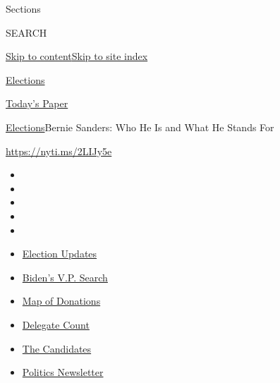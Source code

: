 Sections

SEARCH

\protect\hyperlink{site-content}{Skip to
content}\protect\hyperlink{site-index}{Skip to site index}

\href{https://www.nytimes.com/news-event/2020-election}{Elections}

\href{https://myaccount.nytimes.com/auth/login?response_type=cookie\&client_id=vi}{}

\href{https://www.nytimes.com/section/todayspaper}{Today's Paper}

\href{/news-event/2020-election}{Elections}\textbar{}Bernie Sanders: Who
He Is and What He Stands For

\url{https://nyti.ms/2LIJy5e}

\begin{itemize}
\item
\item
\item
\item
\item
\end{itemize}

\begin{itemize}
\item
  \href{https://www.nytimes.com/2020/07/31/us/elections/biden-vs-trump.html?action=click\&pgtype=Article\&state=default\&region=TOP_BANNER\&context=storylines_menu}{Election
  Updates}
\item
  \href{https://www.nytimes.com/article/biden-vice-president-2020.html?action=click\&pgtype=Article\&state=default\&region=TOP_BANNER\&context=storylines_menu}{Biden's
  V.P. Search}
\item
  \href{https://www.nytimes.com/interactive/2020/07/24/us/politics/trump-biden-campaign-donors.html?action=click\&pgtype=Article\&state=default\&region=TOP_BANNER\&context=storylines_menu}{Map
  of Donations}
\item
  \href{https://www.nytimes.com/interactive/2020/us/elections/delegate-count-primary-results.html?action=click\&pgtype=Article\&state=default\&region=TOP_BANNER\&context=storylines_menu}{Delegate
  Count}
\item
  \href{https://www.nytimes.com/interactive/2019/us/politics/2020-presidential-candidates.html?action=click\&pgtype=Article\&state=default\&region=TOP_BANNER\&context=storylines_menu}{The
  Candidates}
\item
  \href{https://www.nytimes.com/newsletters/politics?action=click\&pgtype=Article\&state=default\&region=TOP_BANNER\&context=storylines_menu}{Politics
  Newsletter}
\end{itemize}

